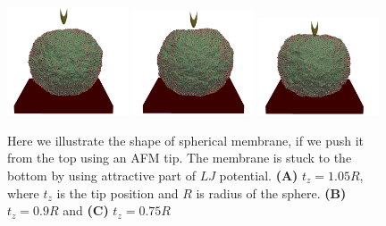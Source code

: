 \documentclass[
]{article}
\begin{document}
\begin{figure}
  \includegraphics[width=0.32\textwidth,height=\textheight]{figs/tip_1p05.png}
  \includegraphics[width=0.32\textwidth,height=\textheight]{figs/tip_0p9.png}
  \includegraphics[width=0.32\textwidth,height=\textheight]{figs/tip_0p75.png}
  \label{fig:push_tip}
  \caption{Here we illustrate the shape of spherical membrane, if we push it from the top using an AFM tip. The membrane is stuck to the bottom by using attractive part of $LJ$ potential. \textbf{(A)} $t_z = 1.05R$, where $t_z$ is the tip position and $R$ is radius of the sphere. \textbf{(B)} $t_z = 0.9R$ and \textbf{(C)} $t_z = 0.75R$}
\end{figure}
\end{document}
